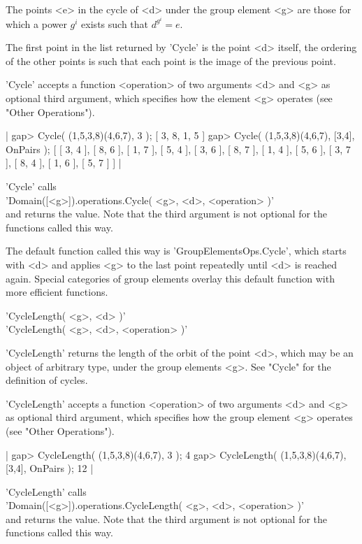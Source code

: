 The points <e> in the cycle of <d> under  the group element <g> are those
for which a power $g^i$ exists such that $d^{g^i} = e$.

The first point in the list returned by 'Cycle' is  the point <d> itself,
the ordering of the other points is such that each point  is the image of
the previous point.

'Cycle' accepts a  function <operation> of two arguments  <d> and  <g> as
optional third argument, which  specifies how  the element   <g> operates
(see "Other Operations").

|    gap> Cycle( (1,5,3,8)(4,6,7), 3 );
    [ 3, 8, 1, 5 ]
    gap> Cycle( (1,5,3,8)(4,6,7), [3,4], OnPairs );
    [ [ 3, 4 ], [ 8, 6 ], [ 1, 7 ], [ 5, 4 ], [ 3, 6 ], [ 8, 7 ],
      [ 1, 4 ], [ 5, 6 ], [ 3, 7 ], [ 8, 4 ], [ 1, 6 ], [ 5, 7 ] ] |

'Cycle' calls \\
'Domain([<g>]).operations.Cycle( <g>, <d>, <operation> )' \\
and returns the value.  Note that the third argument  is not optional for
the functions called this way.

The default function  called this  way is 'GroupElementsOps.Cycle', which
starts with <d> and applies <g> to the last point repeatedly until <d> is
reached again.  Special categories of group elements overlay this default
function with more efficient functions.


'CycleLength( <g>, <d> )' \\
'CycleLength( <g>, <d>, <operation> )'

'CycleLength' returns the length of the orbit of the point <d>, which may
be an object of  arbitrary  type,  under  the  group  elements  <g>.  See
"Cycle" for the definition of cycles.

'CycleLength' accepts a function <operation> of two arguments <d> and <g>
as optional third  argument, which specifies  how the  group element  <g>
operates (see "Other Operations").

|    gap> CycleLength( (1,5,3,8)(4,6,7), 3 );
    4
    gap> CycleLength( (1,5,3,8)(4,6,7), [3,4], OnPairs );
    12 |

'CycleLength' calls \\
'Domain([<g>]).operations.CycleLength( <g>, <d>, <operation> )' \\
and returns the value.  Note that the third argument  is not optional for
the functions called this way.

